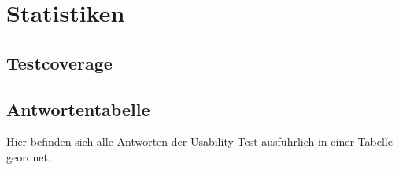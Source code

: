 \section{Statistiken}

\subsection{Testcoverage}

\subsection{Antwortentabelle}

Hier befinden sich alle Antworten der Usability Test ausführlich in einer Tabelle geordnet.